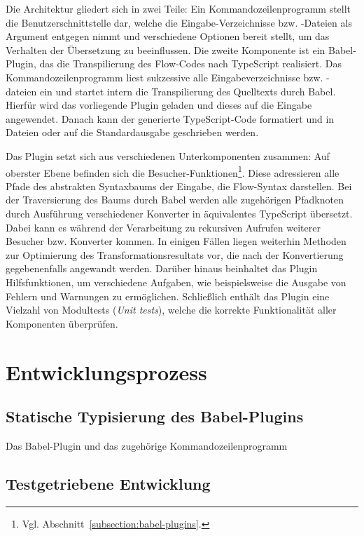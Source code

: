 Die Architektur gliedert sich in zwei Teile: Ein Kommandozeilenprogramm stellt die Benutzerschnittstelle dar, welche die Eingabe-Verzeichnisse bzw. -Dateien als Argument entgegen nimmt und verschiedene Optionen bereit stellt, um das Verhalten der Übersetzung zu beeinflussen. Die zweite Komponente ist ein Babel-Plugin, das die Transpilierung des Flow-Codes nach TypeScript realisiert. Das Kommandozeilenprogramm liest sukzessive alle Eingabeverzeichnisse bzw. -dateien ein und startet intern die Transpilierung des Quelltexts durch Babel. Hierfür wird das vorliegende Plugin geladen und dieses auf die Eingabe angewendet. Danach kann der generierte TypeScript-Code formatiert und in Dateien oder auf die Standardausgabe geschrieben werden.

Das Plugin setzt sich aus verschiedenen Unterkomponenten zusammen: Auf oberster Ebene befinden sich die Besucher-Funktionen\footnote{Vgl. Abschnitt~\ref{subsection:babel-plugins}.}. Diese adressieren alle Pfade des abstrakten Syntaxbaums der Eingabe, die Flow-Syntax darstellen. Bei der Traversierung des Baums durch Babel werden  alle zugehörigen Pfadknoten durch Ausführung verschiedener Konverter in äquivalentes TypeScript übersetzt. Dabei kann es während der Verarbeitung zu rekursiven Aufrufen weiterer Besucher bzw. Konverter kommen. In einigen Fällen liegen weiterhin Methoden zur Optimierung des Transformationsresultats vor, die nach der Konvertierung gegebenenfalls angewandt werden. Darüber hinaus beinhaltet das Plugin Hilfsfunktionen, um verschiedene Aufgaben, wie beispielsweise die Ausgabe von Fehlern und Warnungen zu ermöglichen. Schließlich enthält das Plugin eine Vielzahl von Modultests (\textit{Unit tests}), welche die korrekte Funktionalität aller Komponenten überprüfen.

\section{Entwicklungsprozess}

\subsection{Statische Typisierung des Babel-Plugins}

Das Babel-Plugin und das zugehörige Kommandozeilenprogramm

\subsection{Testgetriebene Entwicklung}

